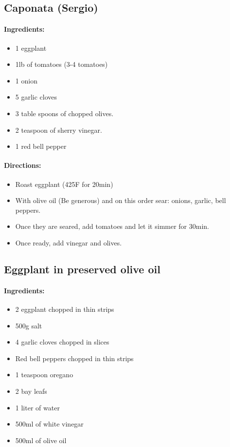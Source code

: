 \documentclass{article}
\begin{document}
\subsection{Caponata (Sergio)}

\paragraph{Ingredients:}

\begin{itemize}
	\item 1 eggplant
	\item 1lb of tomatoes (3-4 tomatoes)
	\item 1 onion
	\item 5 garlic cloves
	\item 3 table spoons of chopped olives.
	\item 2 teaspoon of sherry vinegar.
	\item 1 red bell pepper
\end{itemize}

\paragraph{Directions:}
\begin{itemize}
	\item Roast eggplant (425F for 20min)
	\item With olive oil (Be generous) and on this order sear: onions, garlic, bell peppers.
	\item Once they are seared, add tomatoes and let it simmer for 30min.
	\item Once ready, add vinegar and olives.
\end{itemize}

\subsection{Eggplant in preserved olive oil}{}

\paragraph{Ingredients:}

\begin{itemize}
	\item 2 eggplant chopped in thin strips
	\item 500g salt
	\item 4 garlic cloves chopped in slices
	\item Red bell peppers chopped in thin strips
	\item 1 teaspoon oregano
	\item 2 bay leafs
	\item 1 liter of water
	\item 500ml of white vinegar
	\item 500ml of olive oil
\end{itemize}
\end{document}
